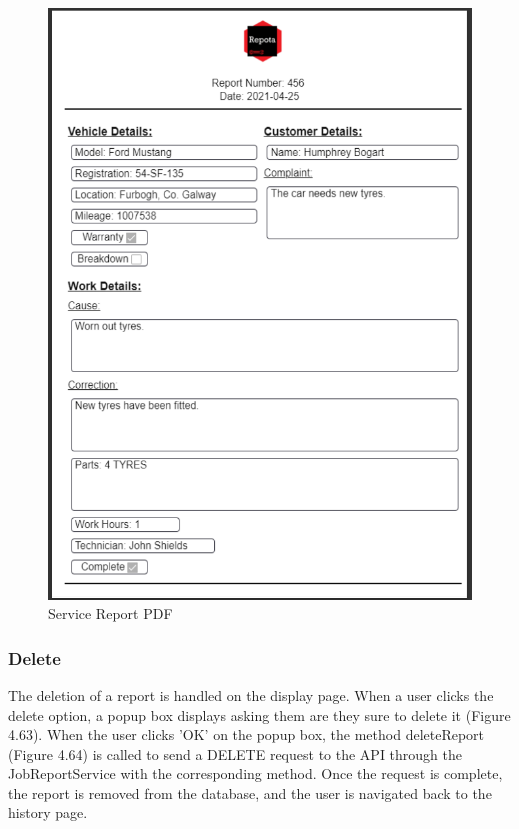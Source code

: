 \begin{figure}[H]
    \centering
    \caption{Service Report PDF}
    \label{image:reportPDF}
    \includegraphics[width=1.0\textwidth]{images/repota/service_report_pdf.png}
\end{figure}

\subsubsection{Delete}
The deletion of a report is handled on the display page. When a user clicks the delete option, a popup box displays asking them are they sure to delete it (Figure 4.63). When the user clicks 'OK' on the popup box, the method deleteReport (Figure 4.64) is called to send a DELETE request to the API through the JobReportService with the corresponding method. Once the request is complete, the report is removed from the database, and the user is navigated back to the history page.

